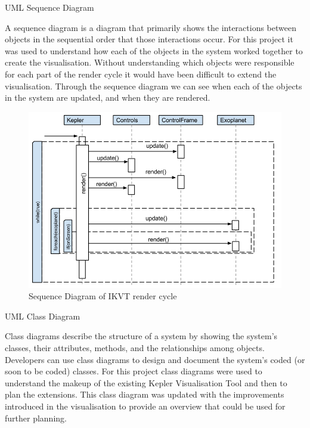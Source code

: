 \begin{enumerate}
\clearpage
{\bf \item UML Sequence Diagram}
  A sequence diagram is a diagram that primarily shows the interactions between
objects in the sequential order that those interactions occur.
For this project it was used to understand how each of the objects in the system
worked together to create the visualisation. Without understanding which objects
were responsible for each part of the render cycle it would have been difficult
to extend the visualisation. Through the sequence diagram we can see when each
of the objects in the system are updated, and when they are rendered. 
   \begin{figure}[H]
  \centering
      \includegraphics[width=1\textwidth]{images/sequence.png}
  \caption{Sequence Diagram of IKVT render cycle}  
    \label{fig:sequenceDiagram}
\end{figure}
\clearpage
 {\bf \item UML Class Diagram}
 Class diagrams describe the structure of a system by showing the system's
classes, their attributes, methods, and the relationships among objects.
 Developers can use class diagrams to design and document the system's coded (or
soon to be coded) classes. For this project class diagrams were used to understand
the makeup of the existing Kepler Visualisation Tool and then to plan the extensions. This class
diagram was updated with the improvements introduced in the visualisation
to provide an overview that could be used for further planning.
 \begin{figure}[H]
  \centering

\end{figure}
\end{enumerate}
